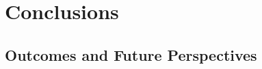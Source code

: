 \part{Conclusions\label{part:conclusions}}

\chapter{Outcomes and Future Perspectives}
    \lipsum[1]

    \lipsum[1-2]

    \lipsum[1-2]

    \lipsum[1-2]

    \lipsum[1]


